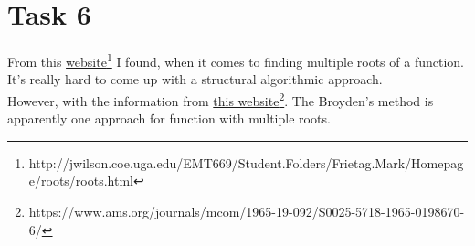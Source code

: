 \documentclass{article}
\begin{document}
\section*{Task 6}
From this \href{http://jwilson.coe.uga.edu/EMT669/Student.Folders/Frietag.Mark/Homepage/roots/roots.html}{website}\footnote{http://jwilson.coe.uga.edu/EMT669/Student.Folders/Frietag.Mark/Homepage/roots/roots.html} I found, when it comes to finding multiple roots of a function. It's really hard to come up with a structural algorithmic approach.\\
However, with the information from \href{https://www.ams.org/journals/mcom/1965-19-092/S0025-5718-1965-0198670-6/}{this website}\footnote{https://www.ams.org/journals/mcom/1965-19-092/S0025-5718-1965-0198670-6/}. The Broyden's method is apparently one approach for function with multiple roots.
\end{document}
